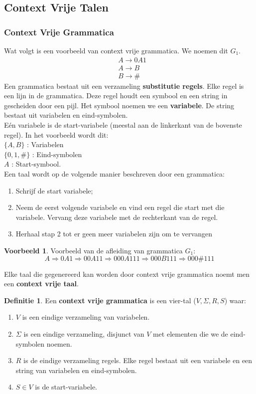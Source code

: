 \documentclass[12pt,a4paper]{article}
\theoremstyle{definition}
\newtheorem{defi}{Definitie}[section]
\newtheorem{vb}{Voorbeeld}[section]
\begin{document}
\subsection{Context Vrije Talen}
\subsubsection{Context Vrije Grammatica}
Wat volgt is een voorbeeld van context vrije grammatica. We noemen dit $G_1$.
\begin{align*}
&A \rightarrow 0A1\\
&A \rightarrow B\\
&B \rightarrow \#
\end{align*}
Een grammatica bestaat uit een verzameling \textbf{substitutie regels}. Elke regel is een lijn in de grammatica. Deze regel houdt een symbool en een string in gescheiden door een pijl. Het symbool noemen we een \textbf{variabele}. De string bestaat uit variabelen en eind-symbolen.\\
Eén variabele is de start-variabele (meestal aan de linkerkant van de bovenste regel). In het voorbeeld wordt dit:\\
$\{A,B\}$ : Variabelen\\
$\{0,1,\#\}$ : Eind-symbolen\\
$A$ : Start-symbool.\\

Een taal wordt op de volgende manier beschreven door een grammatica:
\begin{enumerate}
\item Schrijf de start variabele;
\item Neem de eerst volgende variabele en vind een regel die start met die variabele. Vervang deze variabele met de rechterkant van de regel.
\item Herhaal stap 2 tot er geen meer variabelen zijn om te vervangen
\end{enumerate}
\begin{vb}
Voorbeeld van de afleiding van grammatica $G_1$:
$$A\Rightarrow 0A1 \Rightarrow 00A11 \Rightarrow 000A111 \Rightarrow 000B111 \Rightarrow 000\#111$$
\end{vb}
Elke taal die gegenereerd kan worden door context vrije grammatica noemt men een \textbf{context vrije taal}.
\begin{defi}
Een \textbf{context vrije grammatica} is een vier-tal ($V,\Sigma,R,S$) waar:
\begin{enumerate}
\item $V$ is een eindige verzameling van variabelen.
\item $\Sigma$ is een eindige verzameling, disjunct van $V$ met elementen die we de eind-symbolen noemen.
\item $R$ is de eindige verzameling regels. Elke regel bestaat uit een variabele en een string van variabelen en eind-symbolen.
\item $S\in V$ is de start-variabele.

\end{enumerate}
\end{defi}
\end{document}
